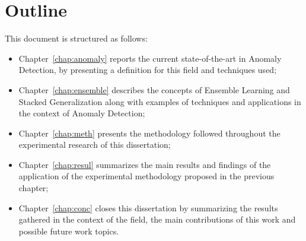 

\section{Outline} \label{sec:outline}

This document is structured as follows:

\begin{itemize}
	\item Chapter~\ref{chap:anomaly} reports the current state-of-the-art in Anomaly Detection, by presenting a definition for this field and techniques used;
	
	\item Chapter~\ref{chap:ensemble} describes the concepts of Ensemble Learning and Stacked Generalization along with examples of techniques and applications in the context of Anomaly Detection;
	
	\item Chapter~\ref{chap:meth} presents the methodology followed throughout the experimental research of this dissertation;
	
	\item Chapter~\ref{chap:resul} summarizes the main results and findings of the application of the experimental methodology proposed in the previous chapter;
	
	\item Chapter~\ref{chap:conc} closes this dissertation by summarizing the results gathered in the context of the field, the main contributions of this work and possible future work topics.
\end{itemize}



